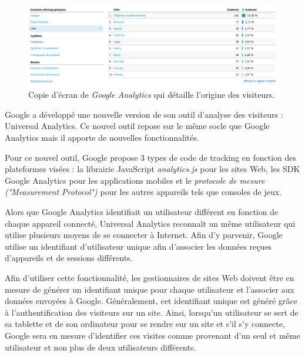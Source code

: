 \begin{figure}[!h]
	\centering
	\includegraphics[scale=0.36]{figures/Google_Analytics_2.png}
	\caption{\label{Google_Analytics_2}Copie d'écran de \textit{Google Analytics} qui détaille l'origine des visiteurs.}
\end{figure}

Google a développé une nouvelle version de son outil d'analyse des visiteurs : Universal Analytics. Ce nouvel outil repose sur le même socle que Google Analytics mais il apporte de nouvelles fonctionnalités.
\newline
\newpage

Pour ce nouvel outil, Google propose 3 types de code de tracking en fonction des plateformes visées : la librairie JavaScript \textit{analytics.js} pour les sites Web, les SDK Google Analytics pour les applications mobiles et le \textit{protocole de mesure ("Measurement Protocol")} pour les autres appareils tels que consoles de jeux.%
\newline

Alors que Google Analytics identifiait un utilisateur différent en fonction de chaque appareil connecté, Universal Analytics reconnaît un même utilisateur qui utilise plusieurs moyens de se connecter à Internet. Afin d'y parvenir, Google utilise un identifiant d'utilisateur unique afin d'associer les données reçues d'appareils et de sessions différents.
\newline

Afin d'utiliser cette fonctionnalité, les gestionnaires de sites Web doivent être en mesure de générer un identifiant unique pour chaque utilisateur et l'associer aux données envoyées à Google. Généralement, cet identifiant unique est généré grâce à l'authentification des visiteurs sur un site. Ainsi, lorsqu'un utilisateur se sert de sa tablette et de son ordinateur pour se rendre sur un site et s'il s'y connecte, Google sera en mesure d'identifier ces visites comme provenant d'un seul et même utilisateur et non plus de deux utilisateurs différents.
\newline

